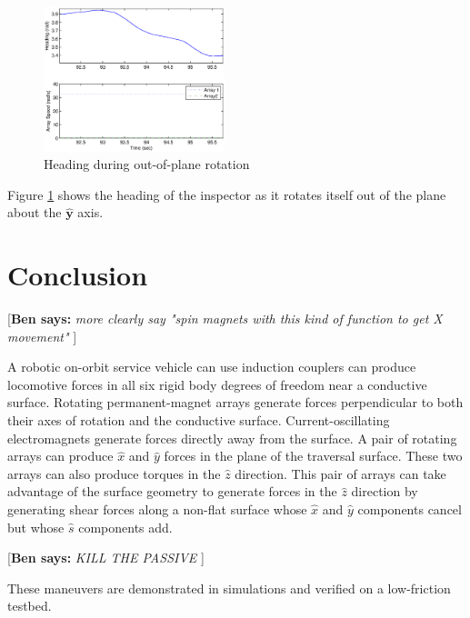 \documentclass[letterpaper, 10 pt, conference]{ieeeconf}  %
\newcommand{\ben}[1]{{\color{red}\small\par {[{\bf Ben says:} {\em #1}} ] \\    }}
\begin{document}
      
         \begin{figure}[thpb]
      \centering
      \includegraphics[width = 0.47\textwidth]{figures/oop_rotation.eps}
      \caption{Heading during out-of-plane rotation}
      \label{fig:oop_rotation_exp}
   \end{figure}
   
   \par Figure \ref{fig:oop_rotation_exp} shows the heading of the inspector as it rotates itself out of the plane about the $\hat{\textbf{y}}$ axis.



\section{Conclusion}
\ben{more clearly say "spin magnets with this kind of function to get X movement"}
A robotic on-orbit service vehicle can use induction couplers can produce locomotive forces in all six rigid body degrees of freedom near a conductive surface. Rotating permanent-magnet arrays generate forces perpendicular to both their axes of rotation and the conductive surface. Current-oscillating electromagnets generate forces directly away from the surface. A pair of rotating arrays can produce $\hat{x}$ and $\hat{y}$ forces in the plane of the traversal surface. These two arrays can also produce torques in the $\hat{z}$ direction. This pair of arrays can take advantage of the surface geometry to generate forces in the $\hat{z}$ direction by generating shear forces along a non-flat surface whose $\hat{x}$ and $\hat{y}$ components cancel but whose $\hat{s}$ components add. \ben{KILL THE PASSIVE} These maneuvers are demonstrated in simulations and verified on a low-friction testbed. 
 
\end{document}
